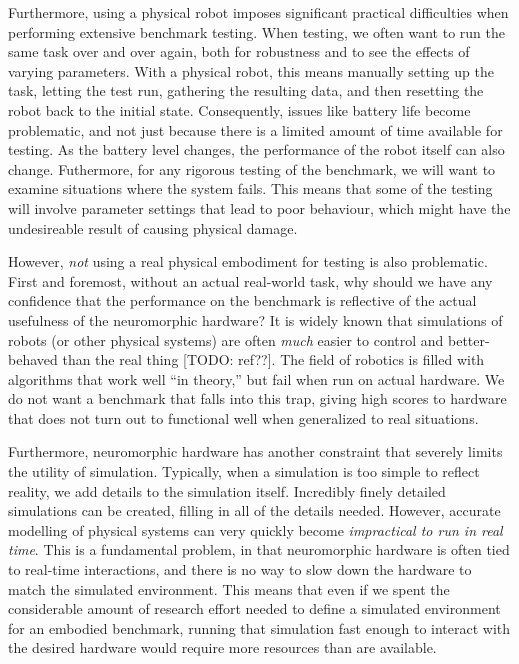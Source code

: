 \documentclass{frontiersSCNS} %
\begin{document}
Furthermore, using a physical robot imposes significant practical
difficulties when performing extensive benchmark testing.  When testing, we
often want to run the same task over and over again, both for robustness and
to see the effects of varying parameters.  With a physical robot, this means
manually setting up the task, letting the test run, gathering the resulting
data, and then resetting the robot back to the initial state.  Consequently,
issues like battery life become problematic, and not just because there is a
limited amount of time available for testing.  As the battery level changes,
the performance of the robot itself can also change.  Futhermore, for any
rigorous testing of the benchmark, we will want to examine situations where
the system fails.  This means that some of the testing will involve parameter
settings that lead to poor behaviour, which might have the undesireable 
result of causing physical damage.

However, \emph{not} using a real physical embodiment for testing is also
problematic.  First and foremost, without an actual real-world task, why
should we have any confidence that the performance on the benchmark is
reflective of the actual usefulness of the neuromorphic hardware?  It is
widely known that simulations of robots (or other physical systems) are
often \emph{much} easier to control and better-behaved than the real thing [TODO: ref??].  The
field of robotics is filled with algorithms that work well ``in theory,'' but
fail when run on actual hardware.  We do not want a benchmark that falls into
this trap, giving high scores to hardware that does not turn out to
functional well when generalized to real situations.

Furthermore, neuromorphic hardware has another constraint that severely limits
the utility of simulation.  Typically, when a simulation is
too simple to reflect reality, we add details to the simulation itself.
Incredibly finely detailed simulations can be created, filling in all of the
details needed.  However, accurate modelling of physical systems can very quickly
become \emph{impractical to run in real time}.
This is a fundamental problem, in that neuromorphic
hardware is often tied to real-time interactions, and there is no way to slow down
the hardware to match the simulated environment.  This means that even if
we spent the considerable amount of research effort needed to define a
simulated environment for an embodied benchmark, running that simulation 
fast enough to interact with the desired hardware would require more
resources than are available.
\end{document}
